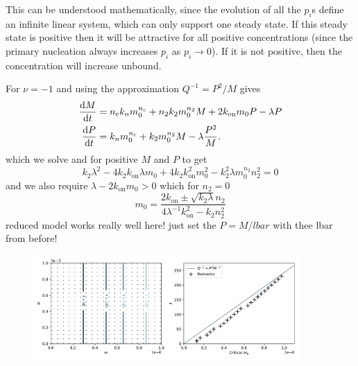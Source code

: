 This can be understood mathematically, since the evolution of all the $p_i$s define an infinite linear system, which can only support one steady state. If this steady state is positive then it will be attractive for all positive concentrations (since the primary nucleation always increases  $p_i$ as $p_i \to 0$). If it is not positive, then the concentration will increase unbound.  

For $\nu=-1$ and using the approximation $Q^{-1}=P^2 / M$ gives
\begin{align}
    \frac{\text{d}M}{\text{d}t}&= n_{\mathrm{c}} k_n m_0^{n_{\mathrm{c}}} + n_2 k_2 m_0^{n_2} M + 2 k_\text{on} m_0 P - \lambda P \\
    \frac{\text{d}P}{\text{d}t}&= k_n m_0^{n_{\mathrm{c}}} + k_2 m_0^{n_2} M - \lambda \frac{P^2}{M}.
    \label{eq:4-nudependent}
\end{align}
which we solve and for positive $M$ and $P$ to get
\begin{equation}
k_2 \lambda^2 - 4 k_2 k_\text{on} \lambda m_0 + 4 k_2 k_\text{on}^2 m_0^{2} - k_2^2 \lambda m_0^{n_2} n_2^2 = 0
\end{equation}
and we also require $\lambda - 2 k_\text{on} m_0 > 0$ which for $n_2 = 0$
\begin{equation}
m_0 = \frac{2 k_\text{on} \pm \sqrt{k_2\lambda} n_2}{4 \lambda^{-1} k_\text{on}^2 - k_2 n_2^2}
\end{equation}
reduced model works really well here! just set the $P=M/lbar$ with thee lbar from before!

\begin{figure}
    \centering
    \includegraphics[width=0.9\textwidth]{figures/numinus1sidebyside.pdf}
    \caption{}
    \label{fig:4-numinus1}
\end{figure}


